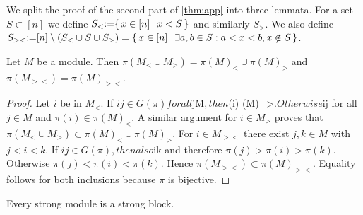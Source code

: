 \documentclass{amsart}
\makeatletter
\theoremstyle{plain}
{
	\newtheorem{{lemma}}{{Lemma}}[section]
	\labelformat{{lemma}}{{Lemma}##}
}
{
	\newtheorem{{theorem}}{{Theorem}}[section]
	\labelformat{{theorem}}{{Theorem}##}
}
{	\@namedef{c@{theorem}}{\@nameuse{c@{lemma}}}}
{
	\newtheorem{{corollary}}{{Corollary}}[section]
	\labelformat{{corollary}}{{Corollary}##}
}
{	\@namedef{c@{corollary}}{\@nameuse{c@{lemma}}}}
{
	\newtheorem{{proposition}}{{Proposition}}[section]
	\labelformat{{proposition}}{{Proposition}##}
}
{	\@namedef{c@{proposition}}{\@nameuse{c@{lemma}}}}
{
	\newtheorem{{algorithm}}{{Construction}}[section]
	\labelformat{{algorithm}}{{Construction}##}
}
{	\@namedef{c@{algorithm}}{\@nameuse{c@{lemma}}}}
\theoremstyle{definition}
{
	\newtheorem{{definition}}{{Definition}}[section]
	\labelformat{{definition}}{{Definition}##}
}
{	\@namedef{c@{definition}}{\@nameuse{c@{lemma}}}}
{
	\newtheorem{{problem}}{{Problem}}[section]
	\labelformat{{problem}}{{Problem}##}
}
{	\@namedef{c@{problem}}{\@nameuse{c@{lemma}}}}
\makeatother
\begin{document}
We split the proof of the second part of \ref{thm:app} into three lemmata.
For a set $S \subset [n]$ we define $S_< {:=}{\left\{\,{x\in[n]{\ \vrule\ } x < S}\,\right\}}$ and similarly $S_>$. We also define ${{{S}}_{><}} {:=} [n]\setminus (S_< \cup S \cup S_>) = {\left\{\,{x\in [n] {\ \vrule\ } \exists a,b\in S: a < x < b, x\notin S}\,\right\}}$.
\begin{lemma}\label{lemma:naka}
	Let $M$ be a module. Then $\pi(M_< \cup M_>) = \pi(M)_< \cup \pi(M)_>$ and $\pi({{{M}}_{><}}) = {{{\pi(M)}}_{><}}$.
\end{lemma}
\begin{proof}
	Let $i$ be in $M_<$.
	If $ij\in{G(\pi)} for all $j\in M$, then $\pi(i) \in \pi(M)_>$.
	Otherwise $ij for all $j\in M$ and $\pi(i) \in \pi(M)_<$.
	A similar argument for $i \in M_>$ proves that $\pi(M_< \cup M_>) \subset \pi(M)_< \cup \pi(M)_>$.
	For $i \in {{{M}}_{><}}$ there exist $j, k\in M$ with $j < i < k$. If $ij\in{G(\pi)}, then also $ik  and therefore $\pi(j) > \pi(i) > \pi(k)$.
	Otherwise $\pi(j) < \pi(i) < \pi(k)$.
	Hence $\pi({{{M}}_{><}}) \subset {{{\pi(M)}}_{><}}$. Equality follows for both inclusions because $\pi$ is bijective.
\end{proof}
\begin{lemma} \label{lemma:L3}
	Every strong module is a strong block.
\end{lemma}
\end{document}
